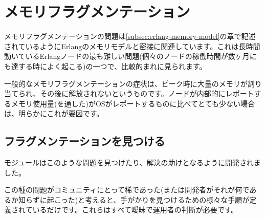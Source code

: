 \section{メモリフラグメンテーション}
\label{sec:memory-fragmentation}

メモリフラグメンテーションの問題は\ref{subsec:erlang-memory-model}の章で記述されているようにErlangのメモリモデルと密接に関連しています。これは長時間動いているErlangノードの最も難しい問題(個々のノードの稼働時間が数ヶ月にも達する時によく起こる)の一つで、比較的まれに見られます。

一般的なメモリフラグメンテーションの症状は、ピーク時に大量のメモリが割り当てられ、その後に解放されないというものです。ノードが内部的にレポートするメモリ使用量(を通した)がOSがレポートするものに比べてとても少ない場合は、明らかにこれが要因です。

\subsection{フラグメンテーションを見つける}

モジュールはこのような問題を見つけたり、解決の助けとなるように開発されました。

この種の問題がコミュニティにとって稀であった(または開発者がそれが何であるか知らずに起こった)と考えると、手がかりを見つけるための様々な手順が定義されているだけです。これらはすべて曖昧で運用者の判断が必要です。

